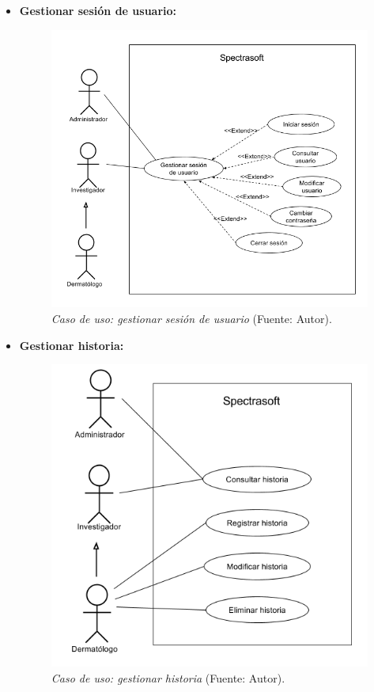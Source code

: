 \begin{itemize}
\newpage
	 	\item \textbf{Gestionar sesi\'{o}n de usuario:}
 	
 		\begin{figure}[H]
		\centering
		\includegraphics[scale=0.5]{img/cu-gestion-sesion.png}
			\caption[Caso de uso: gestionar sesi\'{o}n de usuario]{\textit{ Caso de uso: gestionar sesi\'{o}n de usuario} (Fuente: Autor).}
	\end{figure}
	
		 	\item \textbf{Gestionar historia:}
 	
 		\begin{figure}[H]
		\centering
		\includegraphics[scale=0.5]{img/cu-gestion-historia.png}
			\caption[Caso de uso: gestionar historia]{\textit{ Caso de uso: gestionar historia} (Fuente: Autor).}
	\end{figure}


\end{itemize}
